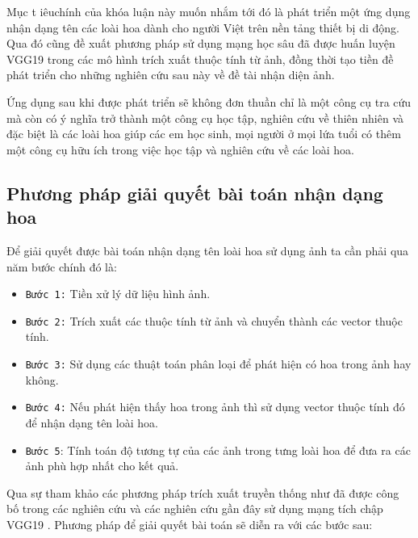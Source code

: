 \documentclass[12pt]{report}
\begin{document}
		Mục t iêuchính của khóa luận này muốn nhắm tới đó là phát triển một ứng dụng nhận dạng tên các loài hoa dành cho người Việt trên nền tảng thiết bị di động. Qua đó cũng đề xuất phương pháp sử dụng mạng học sâu đã được huấn luyện VGG19 \cite{cia_vgg19} trong các mô hình trích xuất thuộc tính từ ảnh, đồng thời tạo tiền đề phát triển cho những nghiên cứu sau này về đề tài nhận diện ảnh.
																																																																						
		Ứng dụng sau khi được phát triển sẽ không đơn thuần chỉ là một công cụ tra cứu mà còn có ý nghĩa trở thành một công cụ học tập, nghiên cứu về thiên nhiên và đặc biệt là các loài hoa giúp các em học sinh, mọi người ở mọi lứa tuổi có thêm một công cụ hữu ích trong việc học tập và nghiên cứu về các loài hoa.
																																																																						
		\subsection{Phương pháp giải quyết bài toán nhận dạng hoa}
																																																																				
		Để giải quyết được bài toán nhận dạng tên loài hoa sử dụng ảnh ta cần phải qua năm bước chính đó là:
																																																																				
		\begin{itemize}
			\item \texttt{Bước 1:} Tiền xử lý dữ liệu hình ảnh.
			\item \texttt{Bước 2:} Trích xuất các thuộc tính từ ảnh và chuyển thành các vector thuộc tính.
			\item \texttt{Bước 3:} Sử dụng các thuật toán phân loại để phát hiện có hoa trong ảnh hay không.
			\item \texttt{Bước 4:}	Nếu phát hiện thấy hoa trong ảnh thì sử dụng vector thuộc tính đó để nhận dạng tên loài hoa.
			\item \texttt{Bước 5}: Tính toán độ tương tự của các ảnh trong tưng loài hoa để đưa ra các ảnh phù hợp nhất cho kết quả.
		\end{itemize}
																																																																		
		Qua sự tham khảo các phương pháp trích xuất truyền thống như đã được công bố trong các nghiên cứu \cite{cia-Nilsback06} \cite{cia-Nilsback08} và các nghiên cứu gần đây sử dụng mạng tích chập VGG19 \cite{cia_vgg19}. Phương pháp để giải quyết bài toán sẽ diễn ra với các bước sau:
																																																																		
\end{document}
